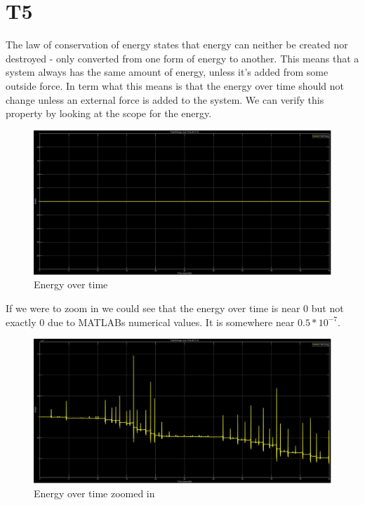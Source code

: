 \documentclass[12pt]{article}
\begin{document}
\section{T5}
 
The law of conservation of energy states that energy can neither be created nor destroyed - only converted from one form of energy to another. This means that a system always has the same amount of energy, unless it's added from some outside force. In term what this means is that the energy over time should not change unless an external force is added to the system. We can verify this property by looking at the scope for the energy. 

\begin{figure}[H]
	\centering
	\includegraphics[scale=0.25]{zoomedoutenergyconservation}
	\caption{Energy over time}
\end{figure}

If we were to zoom in we could see that the energy over time is near 0 but not exactly 0 due to MATLABs numerical values. It is somewhere near $0.5*10^{-7}$.

\begin{figure}[H]
	\centering
	\includegraphics[scale=0.25]{energyconservation}
	\caption{Energy over time zoomed in}
\end{figure}
\end{document}
